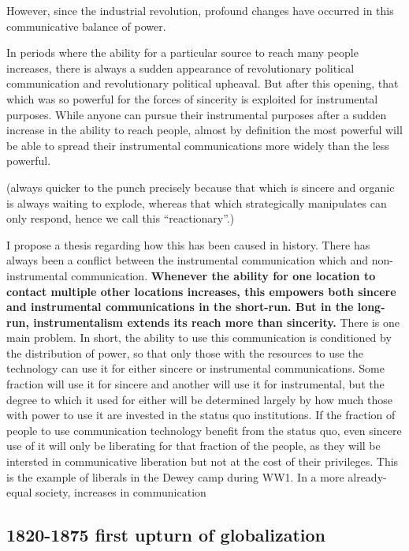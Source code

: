 \documentclass[12pt,book]{article}
\begin{document}
However, since the industrial revolution, profound changes have occurred
in this communicative balance of power.

In periods where the ability for a particular source to reach many
people increases, there is always a sudden appearance of revolutionary
political communication and revolutionary political upheaval. But after
this opening, that which was so powerful for the forces of sincerity is
exploited for instrumental purposes. While anyone can pursue their
instrumental purposes after a sudden increase in the ability to reach
people, almost by definition the most powerful will be able to spread
their instrumental communications more widely than the less powerful.

(always quicker to the punch precisely because that which is sincere and
organic is always waiting to explode, whereas that which strategically
manipulates can only respond, hence we call this ``reactionary''.)

I propose a thesis regarding how this has been caused in history. There
has always been a conflict between the instrumental communication which
and non-instrumental communication. \textbf{Whenever the ability for one
location to contact multiple other locations increases, this empowers
both sincere and instrumental communications in the short-run. But in
the long-run, instrumentalism extends its reach more than sincerity.}
There is one main problem. In short, the ability to use this
communication is conditioned by the distribution of power, so that only
those with the resources to use the technology can use it for either
sincere or instrumental communications. Some fraction will use it for
sincere and another will use it for instrumental, but the degree to
which it used for either will be determined largely by how much those
with power to use it are invested in the status quo institutions. If the
fraction of people to use communication technology benefit from the
status quo, even sincere use of it will only be liberating for that
fraction of the people, as they will be intersted in communicative
liberation but not at the cost of their privileges. This is the example
of liberals in the Dewey camp during WW1. In a more already-equal
society, increases in communication

\subsection{1820-1875 first upturn of
globalization}\label{first-upturn-of-globalization}
\end{document}
